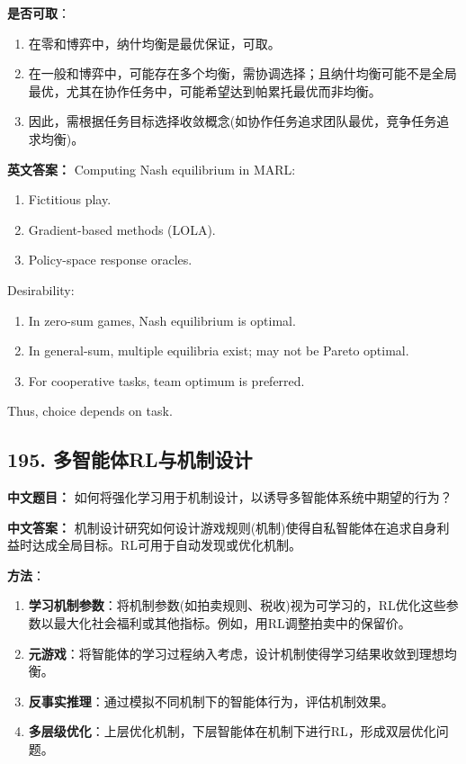 \documentclass[10pt,a4paper]{ctexart}
\begin{document}
\textbf{是否可取}：
\begin{enumerate}
    \item 在零和博弈中，纳什均衡是最优保证，可取。
    \item 在一般和博弈中，可能存在多个均衡，需协调选择；且纳什均衡可能不是全局最优，尤其在协作任务中，可能希望达到帕累托最优而非均衡。
    \item 因此，需根据任务目标选择收敛概念(如协作任务追求团队最优，竞争任务追求均衡)。
\end{enumerate}

\textbf{英文答案：}  
Computing Nash equilibrium in MARL:
\begin{enumerate}
    \item Fictitious play.
    \item Gradient-based methods (LOLA).
    \item Policy-space response oracles.
\end{enumerate}

Desirability:
\begin{enumerate}
    \item In zero-sum games, Nash equilibrium is optimal.
    \item In general-sum, multiple equilibria exist; may not be Pareto optimal.
    \item For cooperative tasks, team optimum is preferred.
\end{enumerate}

Thus, choice depends on task.

\subsection*{195. 多智能体RL与机制设计}
\textbf{中文题目：} 如何将强化学习用于机制设计，以诱导多智能体系统中期望的行为？

\textbf{中文答案：}  
机制设计研究如何设计游戏规则(机制)使得自私智能体在追求自身利益时达成全局目标。RL可用于自动发现或优化机制。

\textbf{方法}：
\begin{enumerate}
    \item \textbf{学习机制参数}：将机制参数(如拍卖规则、税收)视为可学习的，RL优化这些参数以最大化社会福利或其他指标。例如，用RL调整拍卖中的保留价。
    \item \textbf{元游戏}：将智能体的学习过程纳入考虑，设计机制使得学习结果收敛到理想均衡。
    \item \textbf{反事实推理}：通过模拟不同机制下的智能体行为，评估机制效果。
    \item \textbf{多层级优化}：上层优化机制，下层智能体在机制下进行RL，形成双层优化问题。
\end{enumerate}
\end{document}
